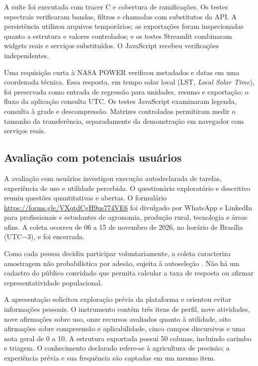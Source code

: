 A suíte foi executada com tracer C e cobertura de ramificações. Os testes espectrais verificaram bandas, filtros e chamadas com substitutos da API. A persistência utilizou arquivos temporários; as exportações foram inspecionadas quanto a estrutura e valores controlados; e os testes Streamlit combinaram widgets reais e serviços substituídos. O JavaScript recebeu verificações independentes.

Uma requisição curta à NASA POWER verificou metadados e datas em uma coordenada técnica. Essa resposta, em tempo solar local (LST, \textit{Local Solar Time}), foi preservada como entrada de regressão para unidades, resumo e exportação; o fluxo da aplicação consulta UTC. Os testes JavaScript examinaram legenda, consulta à grade e descompressão. Matrizes controladas permitiram medir o tamanho da transferência, separadamente da demonstração em navegador com serviços reais.

\subsection{Avaliação com potenciais usuários}\label{sec:pesquisa-usuarios}

A avaliação com usuários investigou execução autodeclarada de tarefas, experiência de uso e utilidade percebida. O questionário exploratório e descritivo reuniu questões quantitativas e abertas. O formulário \url{https://forms.gle/VXqtdCgH9us774VE6} foi divulgado por WhatsApp e LinkedIn para profissionais e estudantes de agronomia, produção rural, tecnologia e áreas afins. A coleta ocorreu de 06 a 15 de novembro de 2026, no horário de Brasília (UTC$-3$), e foi encerrada.

Como cada pessoa decidiu participar voluntariamente, a coleta caracteriza amostragem não probabilística por adesão, sujeita à autoseleção \citep{AAPOR2013}. Não há um cadastro do público convidado que permita calcular a taxa de resposta ou afirmar representatividade populacional.

A apresentação solicitou exploração prévia da plataforma e orientou evitar informações pessoais. O instrumento contém três itens de perfil, nove atividades, nove afirmações sobre uso, onze recursos avaliados quanto à utilidade, oito afirmações sobre compreensão e aplicabilidade, cinco campos discursivos e uma nota geral de 0 a 10. A estrutura exportada possui 50 colunas, incluindo carimbo e triagem. O conhecimento declarado refere-se à agricultura de precisão; a experiência prévia e sua frequência são captadas em um mesmo item.

